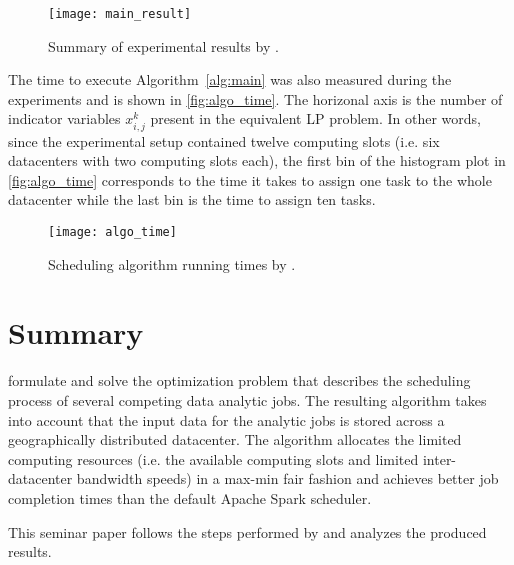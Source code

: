 \begin{figure}
  \centering
  \texttt{[image: main\_result]} \\
  \caption{Summary of experimental results by \citet{Chen2017}.}
  \label{fig:main_result}
\end{figure}

The time to execute Algorithm~\ref{alg:main} was also measured during the experiments and is shown in \autoref{fig:algo_time}. The horizonal axis is the number of indicator variables \(x^k_{i, j}\) present in the equivalent LP problem. In other words, since the experimental setup contained twelve computing slots (i.e. six datacenters with two computing slots each), the first bin of the histogram plot in \autoref{fig:algo_time} corresponds to the time it takes to assign one task to the whole datacenter while the last bin is the time to assign ten tasks.

\begin{figure}
  \centering
  \texttt{[image: algo\_time]} \\
  \caption{Scheduling algorithm running times by \citet{Chen2017}.}
  \label{fig:algo_time}
\end{figure}

\section{Summary}
\citet{Chen2017} formulate and solve the optimization problem that describes the scheduling process of several competing data analytic jobs. The resulting algorithm takes into account that the input data for the analytic jobs is stored across a geographically distributed datacenter. The algorithm allocates the limited computing resources (i.e. the available computing slots and limited inter-datacenter bandwidth speeds) in a max-min fair fashion and achieves better job completion times than the default Apache Spark scheduler.

This seminar paper follows the steps performed by \citet{Chen2017} and analyzes the produced results.
